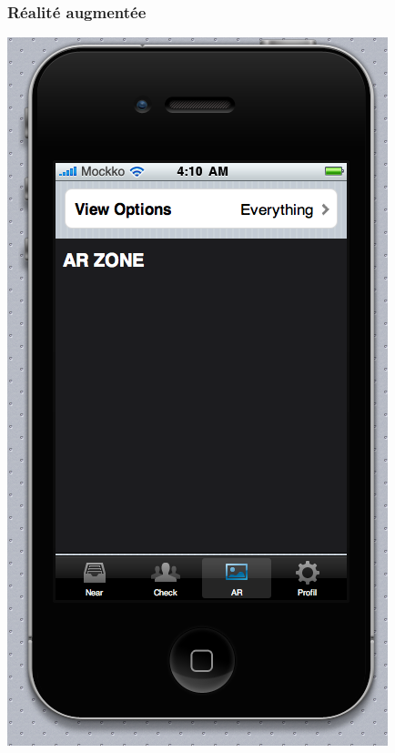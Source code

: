 \documentclass[a4paper,12pt]{report}
\begin{document}
\begin{onehalfspace}
\subsubsection{Réalité augmentée}
\includegraphics[height=\thehauteurscreen cm]{img/4_ar.png}


\end{onehalfspace}
\end{document}
